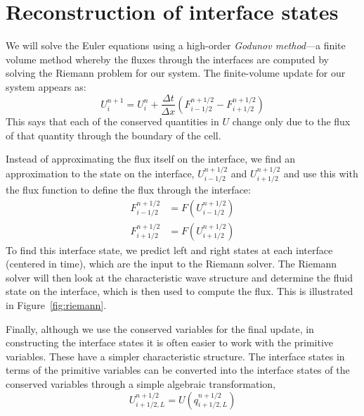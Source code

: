 \label{ch:compressible}



\section{Reconstruction of interface states}

\label{sec:onedrecon}

We will solve the Euler equations using a high-order {\em Godunov
  method}---a finite volume method whereby the fluxes through the
interfaces are computed by solving the Riemann problem for our system.
The finite-volume update for our system appears as:
\begin{equation}
U^{n+1}_i = U^n_i + \frac{\Delta t}{\Delta x} \left ( F_{i-1/2}^{n+1/2} - F_{i+1/2}^{n+1/2} \right )
\end{equation}
This says that each of the conserved quantities in $U$ change only due
to the flux of that quantity through the boundary of the cell.

Instead of approximating the flux itself on the interface, we find an
approximation to the state on the interface, $U_{i-1/2}^{n+1/2}$ and
$U_{i+1/2}^{n+1/2}$ and use this with the flux function to define the
flux through the interface:
\begin{align}
F_{i-1/2}^{n+1/2} &= F(U_{i-1/2}^{n+1/2}) \\
F_{i+1/2}^{n+1/2} &= F(U_{i+1/2}^{n+1/2})
\end{align}
To find this interface state, we predict left and right states at each
interface (centered in time), which are the input to the Riemann
solver.  The Riemann solver will then look at the characteristic wave
structure and determine the fluid state on the interface, which is
then used to compute the flux.  This is illustrated in
Figure~\ref{fig:riemann}.

Finally, although we use the conserved variables for the final update,
in constructing the interface states it is often easier to work with
the primitive variables.  These have a simpler characteristic
structure.  The interface states in terms of the primitive variables
can be converted into the interface states of the conserved variables
through a simple algebraic transformation,
\begin{equation}
U_{i+1/2,L}^{n+1/2} = U(q_{i+1/2,L}^{n+1/2})
\end{equation}

